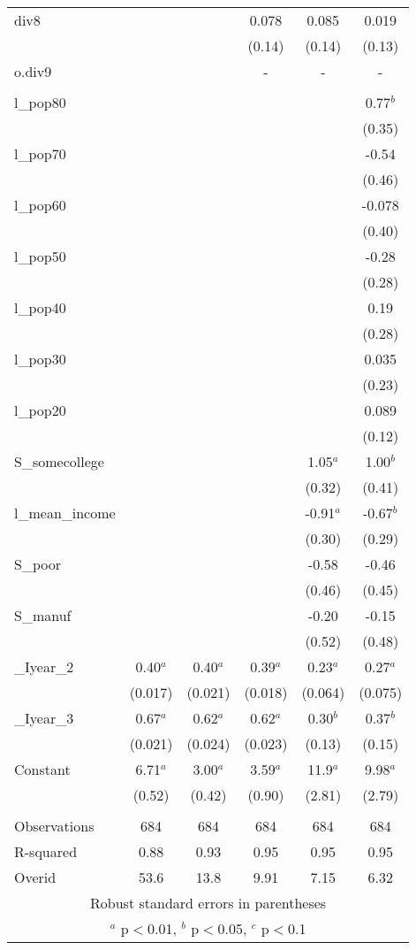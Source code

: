 \documentclass[]{article}
\begin{document}
\begin{tabular}{lccccc}
div8 &  &  & 0.078 & 0.085 & 0.019 \\
 &  &  & (0.14) & (0.14) & (0.13) \\
o.div9 &  &  & - & - & - \\
 &  &  &  &  &  \\
l\_pop80 &  &  &  &  & 0.77$^b$ \\
 &  &  &  &  & (0.35) \\
l\_pop70 &  &  &  &  & -0.54 \\
 &  &  &  &  & (0.46) \\
l\_pop60 &  &  &  &  & -0.078 \\
 &  &  &  &  & (0.40) \\
l\_pop50 &  &  &  &  & -0.28 \\
 &  &  &  &  & (0.28) \\
l\_pop40 &  &  &  &  & 0.19 \\
 &  &  &  &  & (0.28) \\
l\_pop30 &  &  &  &  & 0.035 \\
 &  &  &  &  & (0.23) \\
l\_pop20 &  &  &  &  & 0.089 \\
 &  &  &  &  & (0.12) \\
S\_somecollege &  &  &  & 1.05$^a$ & 1.00$^b$ \\
 &  &  &  & (0.32) & (0.41) \\
l\_mean\_income &  &  &  & -0.91$^a$ & -0.67$^b$ \\
 &  &  &  & (0.30) & (0.29) \\
S\_poor &  &  &  & -0.58 & -0.46 \\
 &  &  &  & (0.46) & (0.45) \\
S\_manuf &  &  &  & -0.20 & -0.15 \\
 &  &  &  & (0.52) & (0.48) \\
\_Iyear\_2 & 0.40$^a$ & 0.40$^a$ & 0.39$^a$ & 0.23$^a$ & 0.27$^a$ \\
 & (0.017) & (0.021) & (0.018) & (0.064) & (0.075) \\
\_Iyear\_3 & 0.67$^a$ & 0.62$^a$ & 0.62$^a$ & 0.30$^b$ & 0.37$^b$ \\
 & (0.021) & (0.024) & (0.023) & (0.13) & (0.15) \\
Constant & 6.71$^a$ & 3.00$^a$ & 3.59$^a$ & 11.9$^a$ & 9.98$^a$ \\
 & (0.52) & (0.42) & (0.90) & (2.81) & (2.79) \\
 &  &  &  &  &  \\
Observations & 684 & 684 & 684 & 684 & 684 \\
R-squared & 0.88 & 0.93 & 0.95 & 0.95 & 0.95 \\
 Overid & 53.6 & 13.8 & 9.91 & 7.15 & 6.32 \\ \hline
\multicolumn{6}{c}{ Robust standard errors in parentheses} \\
\multicolumn{6}{c}{ $^a$ p$<$0.01, $^b$ p$<$0.05, $^c$ p$<$0.1} \\
\end{tabular}
\end{document}

